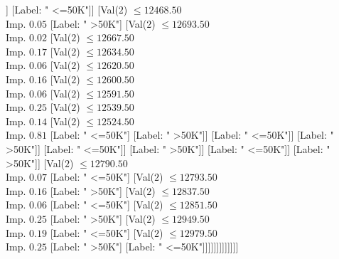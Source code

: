 \documentclass[margin=10pt]{standalone}
\begin{document}
\begin{forest}
																												[Label: " <=50K"]
																												[Label: " >50K"]]
																											[Label: " <=50K"]]
																										[Val($2$) $ \leq 12468.50$ \\ Imp. $0.05$
																											[Label: " >50K"]
																											[Val($2$) $ \leq 12693.50$ \\ Imp. $0.02$
																												[Val($2$) $ \leq 12667.50$ \\ Imp. $0.17$
																													[Val($2$) $ \leq 12634.50$ \\ Imp. $0.06$
																														[Val($2$) $ \leq 12620.50$ \\ Imp. $0.16$
																															[Val($2$) $ \leq 12600.50$ \\ Imp. $0.06$
																																[Val($2$) $ \leq 12591.50$ \\ Imp. $0.25$
																																	[Val($2$) $ \leq 12539.50$ \\ Imp. $0.14$
																																		[Val($2$) $ \leq 12524.50$ \\ Imp. $0.81$
																																			[Label: " <=50K"]
																																			[Label: " >50K"]]
																																		[Label: " <=50K"]]
																																	[Label: " >50K"]]
																																[Label: " <=50K"]]
																															[Label: " >50K"]]
																														[Label: " <=50K"]]
																													[Label: " >50K"]]
																												[Val($2$) $ \leq 12790.50$ \\ Imp. $0.07$
																													[Label: " <=50K"]
																													[Val($2$) $ \leq 12793.50$ \\ Imp. $0.16$
																														[Label: " >50K"]
																														[Val($2$) $ \leq 12837.50$ \\ Imp. $0.06$
																															[Label: " <=50K"]
																															[Val($2$) $ \leq 12851.50$ \\ Imp. $0.25$
																																[Label: " >50K"]
																																[Val($2$) $ \leq 12949.50$ \\ Imp. $0.19$
																																	[Label: " <=50K"]
																																	[Val($2$) $ \leq 12979.50$ \\ Imp. $0.25$
																																		[Label: " >50K"]
																																		[Label: " <=50K"]]]]]]]]]]]]]

\end{forest}
\end{document}
